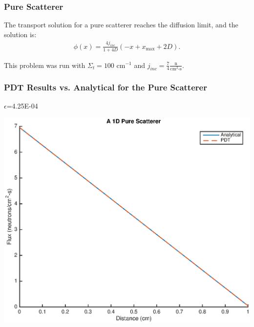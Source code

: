 \documentclass[]{beamer}
\newcommand{\backupend}{
   \setcounter{framenumber}{\value{finalframe}}
}
\begin{document}
\begin{frame}[t]\frametitle{Pure Scatterer}
\begin{block}{}
The transport solution for a pure scatterer reaches the diffusion limit, and the solution is:
\begin{align*}
\phi(x) = \frac{4j_{inc}}{1+4D}(-x + x_{\text{max}} + 2D).
\end{align*}
\end{block}
\begin{block}{}
This problem was run with $\Sigma_t = 100 \text{ cm}^{-1}$ and $j_{inc} = \frac{7}{4} \frac{\text{n}}{\text{cm}^2\text{-s}}$. 
\end{block}
\end{frame}

\begin{frame}[t]\frametitle{PDT Results vs. Analytical for the Pure Scatterer}
\begin{minipage}{0.2\textwidth}
\begin{footnotesize}
$\epsilon$=4.25E-04
\end{footnotesize}
\end{minipage}
\begin{minipage}{0.75\textwidth}
\centering
\includegraphics[scale = 0.5]{figures/PureScatterer.eps}
\end{minipage}

\end{frame}


\backupend

%
%



%	
%	
%	
%	
%
\end{document}
